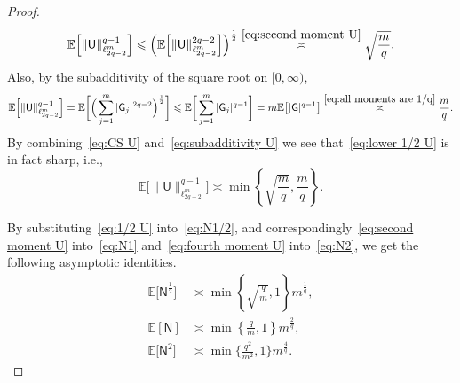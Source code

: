 \documentclass[11pt,reqno]{amsart}
\renewcommand{\le}{\leqslant}
\theoremstyle{remark}
\newcommand{\E}{\mathbb{ E}}
\renewcommand{\1}{\mathbf 1}
\newcommand{\sfG}{\mathsf{G}}
\newcommand{\sfU}{\mathsf{U}}
\newcommand{\sfN}{\mathsf{N}}
\begin{document}
\begin{proof}
\begin{equation}
\E \Big[\|\sfU\|_{\ell_{2q-2}^m}^{q-1}\Big]\le \Big(\E \Big[\|\sfU\|_{\ell_{2q-2}^m}^{2q-2}\Big]\Big)^{\frac12}\stackrel{\eqref{eq:second moment U}}{\asymp} \sqrt{\frac{m}{q}}.
\end{equation}
Also, by the subadditivity of the square root on $[0,\infty)$,
\begin{equation}\label{eq:subadditivity U}
\E \Big[\|\sfU\|_{\ell_{2q-2}^m}^{q-1}\Big]=\E \bigg[\Big(\sum_{j=1}^m |\sfG_j|^{2q-2} \Big)^\frac12\bigg]\le \E \bigg[\sum_{j=1}^m |\sfG_j|^{q-1}\bigg]= m\E\big[|\sfG|^{q-1}\big]\stackrel{\eqref{eq:all moments are 1/q}}{\asymp}\frac{m}{q}.
\end{equation}
By combining~\eqref{eq:CS U} and~\eqref{eq:subadditivity U} we see that~\eqref{eq:lower 1/2 U} is in fact sharp, i.e.,
\begin{equation}\label{eq:1/2 U}
\E \Big[\|\sfU\|_{\ell_{2q-2}^m}^{q-1}\Big]\asymp \min\left\{\sqrt{\frac{m}{q}},\frac{m}{q}\right\}.
\end{equation}

By substituting~\eqref{eq:1/2 U} into~\eqref{eq:N1/2}, and correspondingly~\eqref{eq:second moment U} into~\eqref{eq:N1} and~\eqref{eq:fourth moment U} into~\eqref{eq:N2}, we get the following asymptotic identities.
\begin{align}
\E \big[\sfN^\frac12\big]&\asymp \min\left\{\sqrt{\frac{q}{m}},1\right\}m^{\frac{1}{q}},\label{eq:moment of N1/2}\\
 \E[\sfN]&\asymp \min\left\{\frac{q}{m},1\right\}m^{\frac{2}{q}},\label{eq:moment of N 1}\\
 \E\big[\sfN^2\big]&\asymp \min\Big\{\frac{q^2}{m^2},1\Big\}m^{\frac{4}{q}}\label{eq:moment of N2}.
\end{align}


\end{proof}
\end{document}
